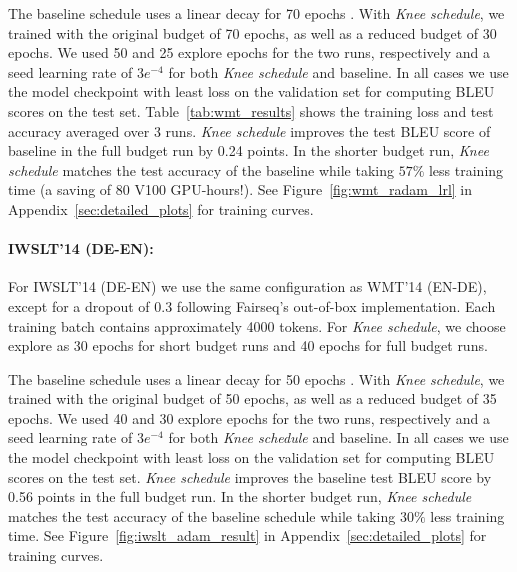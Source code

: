 \documentclass[twoside,11pt]{article}
\newcommand{\lrschedule}{\textit{Knee schedule}}
\begin{document}
The baseline schedule uses a linear decay for 70 epochs \citep{liu2019variance_radam}. With \lrschedule{}, we trained with the original budget of 70 epochs, as well as a reduced budget of 30 epochs. We used 50 and 25 explore epochs for the two runs, respectively and a seed learning rate of $3e^{-4}$ for both \lrschedule{} and baseline. In all cases we use the model checkpoint with least loss on the validation set for computing BLEU scores on the test set. Table~\ref{tab:wmt_results} shows the training loss and test accuracy averaged over 3 runs. \lrschedule{} improves the test BLEU score of baseline in the full budget run by 0.24 points. In the shorter budget run, \lrschedule{} matches the test accuracy of the baseline while taking $57\%$ less training time (a saving of 80 V100 GPU-hours!). See Figure~\ref{fig:wmt_radam_lrl} in Appendix~\ref{sec:detailed_plots} for training curves.



\paragraph{IWSLT'14 (DE-EN):} For IWSLT'14 (DE-EN) we use the same configuration as WMT'14 (EN-DE), except for a dropout of 0.3 following Fairseq's out-of-box implementation. Each training batch contains approximately 4000 tokens. For \lrschedule{}, we choose explore as 30 epochs for short budget runs and 40 epochs for full budget runs.

The baseline schedule uses a linear decay for 50 epochs \citep{liu2019variance_radam}. With \lrschedule{}, we trained with the original budget of 50 epochs, as well as a reduced budget of 35 epochs. We used 40 and 30 explore epochs for the two runs, respectively and a seed learning rate of $3e^{-4}$ for both \lrschedule{} and baseline. In all cases we use the model checkpoint with least loss on the validation set for computing BLEU scores on the test set. \lrschedule{} improves the baseline test BLEU score by 0.56 points in the full budget run. In the shorter budget run, \lrschedule{} matches the test accuracy of the baseline schedule while taking $30\%$ less training time. See Figure~\ref{fig:iwslt_adam_result} in Appendix~\ref{sec:detailed_plots} for training curves.
\end{document}
